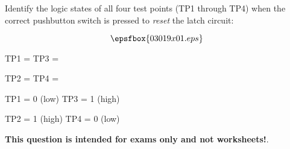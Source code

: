 

Identify the logic states of all four test points (TP1 through TP4) when the correct pushbutton switch is pressed to {\it reset} the latch circuit:

$$\epsfbox{03019x01.eps}$$

TP1 = \hskip 100pt TP3 = 

\vskip 10pt

TP2 = \hskip 100pt TP4 = 







TP1 = 0 (low) \hskip 100pt TP3 = 1 (high)

\vskip 10pt

TP2 = 1 (high) \hskip 100pt TP4 = 0 (low)







{\bf This question is intended for exams only and not worksheets!}.




